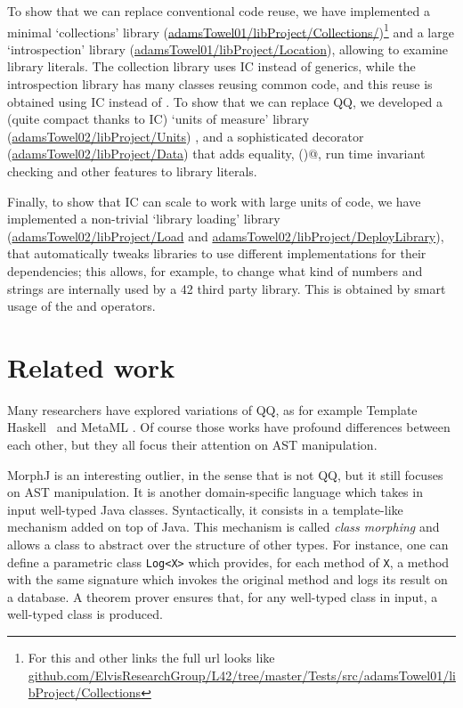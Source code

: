 To show that we can replace conventional code reuse,
we have implemented a minimal `collections' library
(\url{adamsTowel01/libProject/Collections/})\footnote{
For this and other links the full url looks like \url{github.com/ElvisResearchGroup/L42/tree/master/Tests/src/adamsTowel01/libProject/Collections}
}
 and a large `introspection' library
(\url{adamsTowel01/libProject/Location}), 
allowing to examine library literals.
The collection library uses IC instead of generics,
while the introspection library has many classes reusing common code, and this reuse is obtained using IC instead of
\Q@extends@.
To show that we can replace QQ, we developed
a (quite compact thanks to IC) `units of measure' library
(\url{adamsTowel02/libProject/Units})
, and a sophisticated \Q@Data@ decorator
(\url{adamsTowel02/libProject/Data})
that adds equality, \Q@toS()@, run time invariant checking and other features to library literals.

Finally, to show that IC can scale to work with large units of code,
we have implemented a non-trivial `library loading' library
(\url{adamsTowel02/libProject/Load} and
\url{adamsTowel02/libProject/DeployLibrary}), that 
automatically tweaks libraries to use different implementations for their dependencies;
this allows, for example, to change what kind of numbers and 
strings are internally used by a 42 third party library.
This is obtained by smart usage of the \Q@Redirect@ and \Q@Rename@ operators.


\section{Related work}

Many researchers have explored variations of QQ, as for example
Template Haskell~\cite{sheard2002template} and MetaML \cite{moggi1999idealized}.
Of course those works have profound differences between each other, but they all
focus their attention on AST manipulation.

MorphJ \cite{huang2008expressive} is an interesting outlier, in the sense that is not QQ, but 
it still focuses on AST manipulation. It is another domain-specific language which takes in input well-typed Java classes. Syntactically, it consists in a template-like mechanism added on top of Java. This mechanism is called  
\emph{class morphing} and allows a class to abstract over the structure of other types. For instance, one can define a parametric class \lstinline{Log<X>} which provides, for each method of \lstinline{X}, a method with the same signature which invokes the original method and logs its result on a database.
A theorem prover ensures that, for any well-typed class in input, a well-typed class is produced.

